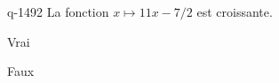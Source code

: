 \begin{truefalse}{q-1492}
La fonction $x\mapsto 11x-7/2$ est croissante.
\item* Vrai
\item Faux
\end{truefalse}

